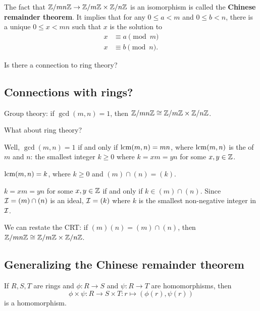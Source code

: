 \documentclass[12pt,letterpaper]{report}
\begin{document}
\begin{tcolorbox}
  The fact that $\mathbb{Z}/{mn}\mathbb{Z} \to \mathbb{Z}/{m}\mathbb{Z} \times \mathbb{Z}/{n}\mathbb{Z}$ is an isomorphism is called the
  \textbf{Chinese remainder theorem}.
  It implies that for any $0 \leq a < m$ and $0 \leq b < n$, there is a unique $0 \leq x < mn$ such
  that $x$ is the solution to
  \begin{align*}
    x &\equiv a \pmod{m} \\
    x &\equiv b \pmod{n}.
  \end{align*}
\end{tcolorbox}

Is there a connection to ring theory?

\pagebreak
\subsection{Connections with rings?}

Group theory: if $\gcd(m, n) = 1$, then $\mathbb{Z}/{mn}\mathbb{Z} \cong \mathbb{Z}/{m}\mathbb{Z} \times \mathbb{Z}/{n}\mathbb{Z}$.

What about ring theory?

Well, $\gcd(m, n) = 1$ if and only if $\operatorname{lcm}(m, n) = mn$, where $\operatorname{lcm}(m, n)$ is the  of $m$ and $n$: the smallest integer $k \geq 0$ where $k = xm = yn$ for some
$x, y \in \mathbb{Z}$.

\begin{lem}{}{}
  $\operatorname{lcm}(m, n) = k$, where $k \geq 0$ and $(m) \cap (n) = (k)$.
\end{lem}

\begin{thmproof}
  $k = xm = yn$ for some $x, y \in \mathbb{Z}$ if and only if $k \in (m) \cap (n)$.
  Since $\mathcal{I} = (m) \cap (n)$ is an ideal, $\mathcal{I} = (k)$ where $k$ is the smallest non-negative
  integer in $\mathcal{I}$.
\end{thmproof}

We can restate the CRT: if $(m)(n) = (m) \cap (n)$, then $\mathbb{Z}/{mn}\mathbb{Z} \cong \mathbb{Z}/{m}\mathbb{Z} \times \mathbb{Z}/{n}\mathbb{Z}$.

\pagebreak
\subsection{Generalizing the Chinese remainder theorem}

\begin{lem}{}{}
  If $R, S, T$ are rings and $\phi \colon R \to S$ and $\psi \colon R \to T$ are homomorphisms, then
  \[ \phi \times \psi \colon R \to S \times T : r \mapsto (\phi(r), \psi(r)) \]
  is a homomorphism.
\end{lem}
\end{document}
